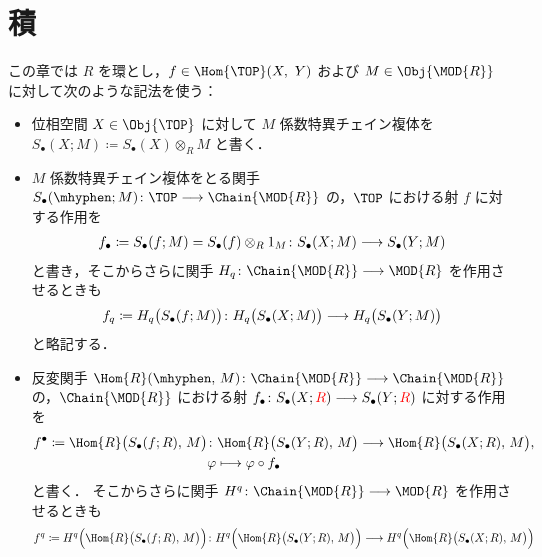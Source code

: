 \documentclass[algtopo_main]{subfiles}
\begin{document}
\setcounter{chapter}{4}

\chapter{積}


この章では $R$ を環とし，$f \in \Hom{\TOP} (X,\ Y)$ および $M \in \Obj{\MOD{R}}$ に対して次のような記法を使う：
\begin{itemize}
    \item 位相空間 $X \in \Obj{\TOP}$ に対して $M$ 係数特異チェイン複体を $S_\bullet (X; M) \coloneqq S_\bullet (X) \otimes_R M$ と書く．
    \item $M$ 係数特異チェイン複体をとる関手 $S_\bullet (\mhyphen; M) \colon \TOP \lto \Chain{\MOD{R}}$ の，$\TOP$ における射 $f$ に対する作用を
    \begin{align}
        \label{not:SingularChain-morphism}
        f_\bullet \coloneqq S_\bullet(f; M) = S_\bullet(f) \otimes_R 1_M \colon S_\bullet (X; M) \longrightarrow S_\bullet (Y; M)
    \end{align}
    と書き，そこからさらに関手 $H_q \colon \Chain{\MOD{R}} \lto \MOD{R}$ を作用させるときも
    \begin{align}
        \label{not:SingularHomology-morphism}
        f_q \coloneqq H_q \bigl( S_\bullet(f; M) \bigr) \colon H_q \bigl( S_\bullet (X; M) \bigr) \longrightarrow H_q \bigl( S_\bullet (Y; M) \bigr) 
    \end{align}
    と略記する．
    \item 反変関手 $\Hom{R}(\mhyphen,\, M) \colon \Chain{\MOD{R}} \lto \Chain{\MOD{R}}$ の，$\Chain{\MOD{R}}$ における射 $f_\bullet \colon S_\bullet (X; \textcolor{red}{R}) \longrightarrow S_\bullet (Y; \textcolor{red}{R})$ に対する作用を
    \begin{align}
        \label{not:SingularChain-Hom-morphism}
        f^\bullet \coloneqq \Hom{R} \bigl(S_\bullet(f; R),\, M\bigr) &\colon \Hom{R} \bigl( S_\bullet(Y; R),\, M\bigr) \lto \Hom{R} \bigl( S_\bullet (X; R),\, M \bigr),\\ 
        &\varphi \lmto \varphi \circ f_\bullet
    \end{align}
    と書く．
    そこからさらに関手 $H^q \colon \Chain{\MOD{R}} \lto \MOD{R}$ を作用させるときも
    \begin{align}
        \label{not:SingularCohomology-morphism}
        f^q \coloneqq H^q\Bigl(\Hom{R} \bigl(S_\bullet(f; R),\, M\bigr)\Bigr) \colon H^q\Bigl(\Hom{R} \bigl( S_\bullet(Y; R),\, M\bigr)\Bigr) \lto H^q \Bigl(\Hom{R} \bigl( S_\bullet (X; R),\, M \bigr)\Bigr)
    \end{align}

\end{itemize}
\end{document}
